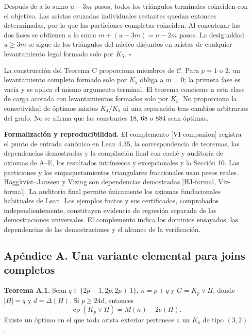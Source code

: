 \documentclass[spanish,11pt,a4paper]{article}
\begin{document}
Después de a lo sumo \(u-3m\) pasos, todos los triángulos terminales
coinciden con el objetivo. Las aristas cruzadas individuales restantes
quedan entonces determinadas, por lo que las particiones completas
coinciden. Al concatenar las dos fases se obtienen a lo sumo
\(m+(u-3m)=u-2m\) pasos. La desigualdad \(u\ge3m\) se sigue de los
triángulos del núcleo disjuntos en aristas de cualquier levantamiento
legal formado solo por \(K_5\). \(\square\)

La construcción del Teorema C proporciona miembros de \(\mathcal C\).
Para \(p=1\) o \(2\), un levantamiento completo formado solo por \(K_5\)
obliga a \(m=0\); la primera fase es vacía y se aplica el mismo
argumento terminal. El teorema concierne a esta clase de carga acotada
con levantamientos formados solo por \(K_5\). No proporciona la
conectividad de óptimos mixtos \(K_4/K_5\) ni una reparación tras
cambios arbitrarios del grafo. No se afirma que las constantes \(18\),
\(68\) o \(884\) sean óptimas.

\textbf{Formalización y reproducibilidad.} El complemento
{[}VI-companion{]} registra el punto de entrada canónico en Lean 4.35,
la correspondencia de teoremas, las dependencias demostradas y la
compilación final con caché y auditoría de axiomas de A--E, los
resultados intrínsecos y excepcionales y la Sección 10. Las particiones
y los empaquetamientos triangulares fraccionales usan pesos reales.
Häggkvist--Janssen y Vizing son dependencias demostradas {[}HJ-formal,
Viz-formal{]}. La auditoría final permite únicamente los axiomas
fundacionales habituales de Lean. Los ejemplos finitos y sus
certificados, comprobados independientemente, constituyen evidencia de
regresión separada de las demostraciones universales. El complemento
indica los dominios ensayados, las dependencias de las demostraciones y
el alcance de la verificación.

\subsection{Apéndice A. Una variante elemental para joins
completos}\label{apuxe9ndice-a.-una-variante-elemental-para-joins-completos}

\textbf{Teorema A.1.} Sean \(q\in\{2p-1,2p,2p+1\}\), \(n=p+q\) y
\(G=K_p\vee H\), donde \(|H|=q\) y \(d=\Delta(H)\). Si \(p\ge24d\),
entonces \[
\operatorname{cp}(K_p\vee H)=M(n)-2e(H). \tag{23}
\] Existe un óptimo en el que toda arista exterior pertenece a un
\(K_5\) de tipo \((3,2)\).
\end{document}
